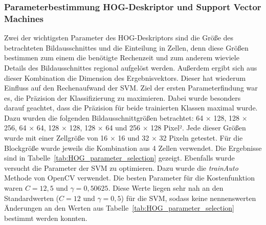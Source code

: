 \subsubsection{Parameterbestimmung HOG-Deskriptor und Support Vector Machines} \label{sssec:HOG:parmeter}
Zwei der wichtigsten Parameter des HOG-Deskriptors sind die Größe des betrachteten Bildausschnittes und die Einteilung in Zellen, denn diese Größen bestimmen zum einem die benötigte Rechenzeit und zum anderem wieviele Details des Bildausschnittes regional aufgelöst werden. Außerdem ergibt sich aus dieser Kombination die Dimension des Ergebnisvektors. Dieser hat wiederum Einfluss auf den Rechenaufwand der SVM. Ziel der ersten Parameterfindung war es, die Präzision der Klassifizierung zu maximieren. Dabei wurde besonders darauf geachtet, dass die Präzision für beide trainierten Klassen maximal wurde. Dazu wurden die folgenden Bildausschnittgrößen betrachtet: 64 $\times$ 128, 128  $\times$ 256, 64 $\times$ 64, 128 $\times$ 128, 128 $\times$ 64 und 256 $\times$ 128 Pixel². Jede dieser Größen wurde mit einer Zellgröße von 16 $\times$ 16 und 32 $\times$ 32 Pixeln getestet. Für die Blockgröße wurde jeweils die Kombination aus 4 Zellen verwendet. Die Ergebnisse sind in Tabelle~\ref{tab:HOG_parameter_selection} gezeigt.  
Ebenfalls wurde versucht die Parameter der SVM zu optimieren. Dazu wurde die \textit{trainAuto} Methode von OpenCV verwendet. Die besten Parameter für die Kostenfunktion waren $C=12,5$ und $\gamma=0,50625$. Diese Werte liegen sehr nah an den Standardwerten ($C=12$ und $\gamma=0,5$) für die SVM, sodass keine nennenswerten Änderungen an den Werten aus Tabelle~\ref{tab:HOG_parameter_selection} bestimmt werden konnten.

